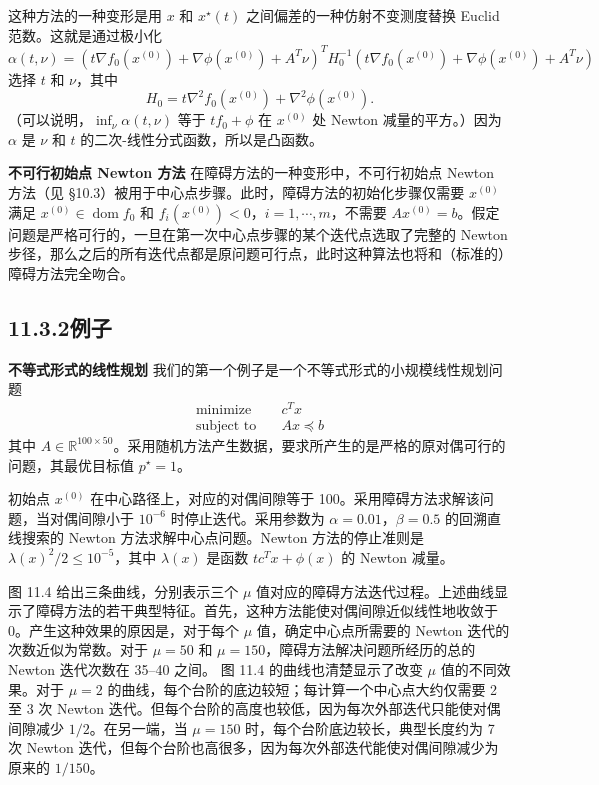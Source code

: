 \documentclass[UTF8,12pt,a4paper,fontset=fandol]{ctexart}
\begin{document}
这种方法的一种变形是用 $x$ 和 $x^\star(t)$ 之间偏差的一种仿射不变测度替换 Euclid 范数。这就是通过极小化
\[
\alpha(t,\nu)=\left(t\nabla f_0(x^{(0)})+\nabla\phi(x^{(0)})+A^T\nu\right)^TH_0^{-1}\left(t\nabla f_0(x^{(0)})+\nabla\phi(x^{(0)})+A^T\nu\right)
\]
选择 $t$ 和 $\nu$，其中
\[
H_0=t\nabla^2 f_0(x^{(0)})+\nabla^2\phi(x^{(0)}).
\]
（可以说明，$\inf_\nu\alpha(t,\nu)$ 等于 $tf_0+\phi$ 在 $x^{(0)}$ 处 Newton 减量的平方。）因为 $\alpha$ 是 $\nu$ 和 $t$ 的二次-线性分式函数，所以是凸函数。

\noindent\textbf{不可行初始点 Newton 方法}\quad
在障碍方法的一种变形中，不可行初始点 Newton 方法（见 \S10.3）被用于中心点步骤。此时，障碍方法的初始化步骤仅需要 $x^{(0)}$ 满足 $x^{(0)}\in\operatorname{dom} f_0$ 和 $f_i(x^{(0)})<0$，$i=1,\cdots,m$，不需要 $Ax^{(0)}=b$。假定问题是严格可行的，一旦在第一次中心点步骤的某个迭代点选取了完整的 Newton 步径，那么之后的所有迭代点都是原问题可行点，此时这种算法也将和（标准的）障碍方法完全吻合。

\subsection*{11.3.2\quad 例子}

\noindent\textbf{不等式形式的线性规划}\quad
我们的第一个例子是一个不等式形式的小规模线性规划问题
\[
\begin{aligned}
\text{minimize}\quad & c^Tx\\
\text{subject to}\quad & Ax\preceq b
\end{aligned}
\]
其中 $A\in\mathbb{R}^{100\times 50}$。采用随机方法产生数据，要求所产生的是严格的原对偶可行的问题，其最优目标值 $p^\star=1$。

初始点 $x^{(0)}$ 在中心路径上，对应的对偶间隙等于 100。采用障碍方法求解该问题，当对偶间隙小于 $10^{-6}$ 时停止迭代。采用参数为 $\alpha=0.01$，$\beta=0.5$ 的回溯直线搜索的 Newton 方法求解中心点问题。Newton 方法的停止准则是 $\lambda(x)^2/2\leq 10^{-5}$，其中 $\lambda(x)$ 是函数 $tc^Tx+\phi(x)$ 的 Newton 减量。

图 11.4 给出三条曲线，分别表示三个 $\mu$ 值对应的障碍方法迭代过程。上述曲线显示了障碍方法的若干典型特征。首先，这种方法能使对偶间隙近似线性地收敛于 0。产生这种效果的原因是，对于每个 $\mu$ 值，确定中心点所需要的 Newton 迭代的次数近似为常数。对于 $\mu=50$ 和 $\mu=150$，障碍方法解决问题所经历的总的 Newton 迭代次数在 35--40 之间。
图 11.4 的曲线也清楚显示了改变 $\mu$ 值的不同效果。对于 $\mu=2$ 的曲线，每个台阶的底边较短；每计算一个中心点大约仅需要 2 至 3 次 Newton 迭代。但每个台阶的高度也较低，因为每次外部迭代只能使对偶间隙减少 $1/2$。在另一端，当 $\mu=150$ 时，每个台阶底边较长，典型长度约为 7 次 Newton 迭代，但每个台阶也高很多，因为每次外部迭代能使对偶间隙减少为原来的 $1/150$。
\end{document}

